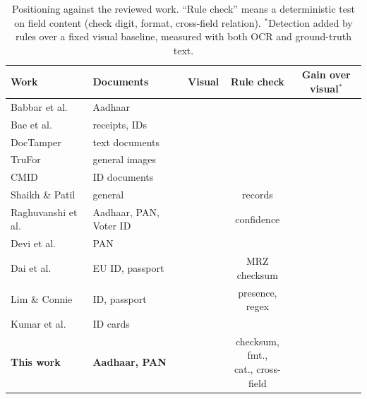 \documentclass[12pt]{article}
\newcommand{\cmark}{\textcolor{cfuse}{\ding{51}}}
\newcommand{\xmark}{\textcolor{cbad}{\ding{55}}}
\begin{document}
\begin{table}[H]
\caption{Positioning against the reviewed work. ``Rule check'' means a
deterministic test on field content (check digit, format, cross-field
relation). $^{\ast}$Detection added by rules over a fixed visual
baseline, measured with both OCR and ground-truth text.}
\label{tab:related}
\centering
\scriptsize
\setlength{\tabcolsep}{2.2pt}
\renewcommand{\arraystretch}{1.12}
\begin{adjustbox}{max width=\linewidth}
\begin{tabular}{@{}l >{\raggedright\arraybackslash}p{3.0cm} c c c@{}}
\toprule
Work & Documents & Visual & Rule check & \makecell{Gain over\\visual$^{\ast}$} \\
\midrule
Babbar et al.~\cite{babbar}       & Aadhaar              & \cmark & \xmark & \xmark \\
Bae et al.~\cite{bae}             & receipts, IDs        & \cmark & \xmark & \xmark \\
DocTamper~\cite{doctamper}        & text documents       & \cmark & \xmark & \xmark \\
TruFor~\cite{trufor}              & general images       & \cmark & \xmark & \xmark \\
CMID~\cite{cmid}                  & ID documents         & \cmark & \xmark & \xmark \\
Shaikh \& Patil~\cite{shaikh}     & general              & \cmark & records & \xmark \\
Raghuvanshi et al.~\cite{raghuvanshi} & Aadhaar, PAN, Voter ID & \xmark & confidence & \xmark \\
Devi et al.~\cite{panens}         & PAN                  & \xmark & \xmark & \xmark \\
Dai et al.~\cite{dai}             & EU ID, passport      & \cmark & MRZ checksum & \xmark \\
Lim \& Connie~\cite{limconnie}    & ID, passport         & \cmark & presence, regex & \xmark \\
Kumar et al.~\cite{flid}          & ID cards             & \cmark & \xmark & \xmark \\
\addlinespace[4pt]
\textbf{This work}                & \textbf{Aadhaar, PAN} & \cmark & \makecell[c]{checksum, fmt.,\\cat., cross-field} & \cmark \\
\bottomrule
\end{tabular}
\end{adjustbox}
\end{table}
\end{document}
